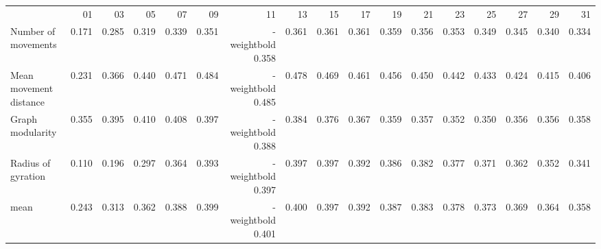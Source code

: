 \begin{tabular}{lrrrrrrrrrrrrrrrr}
 & 01 & 03 & 05 & 07 & 09 & 11 & 13 & 15 & 17 & 19 & 21 & 23 & 25 & 27 & 29 & 31 \\
Number of movements & 0.171 & 0.285 & 0.319 & 0.339 & 0.351 & \font-weightbold 0.358 & 0.361 & 0.361 & 0.361 & 0.359 & 0.356 & 0.353 & 0.349 & 0.345 & 0.340 & 0.334 \\
Mean movement distance & 0.231 & 0.366 & 0.440 & 0.471 & 0.484 & \font-weightbold 0.485 & 0.478 & 0.469 & 0.461 & 0.456 & 0.450 & 0.442 & 0.433 & 0.424 & 0.415 & 0.406 \\
Graph modularity & 0.355 & 0.395 & 0.410 & 0.408 & 0.397 & \font-weightbold 0.388 & 0.384 & 0.376 & 0.367 & 0.359 & 0.357 & 0.352 & 0.350 & 0.356 & 0.356 & 0.358 \\
Radius of gyration & 0.110 & 0.196 & 0.297 & 0.364 & 0.393 & \font-weightbold 0.397 & 0.397 & 0.397 & 0.392 & 0.386 & 0.382 & 0.377 & 0.371 & 0.362 & 0.352 & 0.341 \\
mean & 0.243 & 0.313 & 0.362 & 0.388 & 0.399 & \font-weightbold 0.401 & 0.400 & 0.397 & 0.392 & 0.387 & 0.383 & 0.378 & 0.373 & 0.369 & 0.364 & 0.358 \\
\end{tabular}
